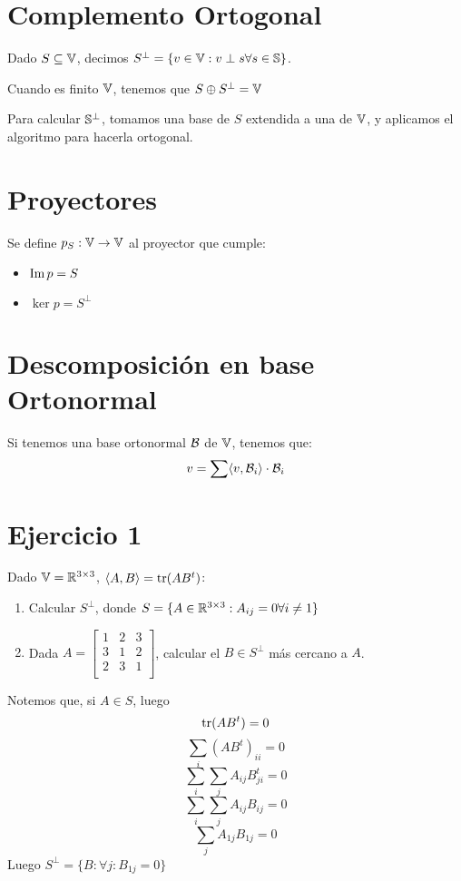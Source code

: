 \documentclass{article}
\begin{document}
\section*{Complemento Ortogonal}
Dado $S \inn \V$, decimos $S^\perp = \{ v \in \V : v \perp s \forall s \in \S \}$.

Cuando es finito $\V$, tenemos que $S \oplus S^\perp = \V$

Para calcular $\S^\perp$, tomamos una base de $S$ extendida a una de $\V$, y aplicamos el algoritmo para hacerla ortogonal.

\section*{Proyectores}
Se define $p_S : \V \to \V$ al proyector que cumple:
\begin{itemize}
    \item $\Ima p = S$
    \item $\ker p = S^\perp$
\end{itemize}

\section*{Descomposición en base Ortonormal}
Si tenemos una base ortonormal $\BB$ de $\V$, tenemos que:
\[
    v = \sum \langle v, \BB_i \rangle \cdot \BB_i
\]

\section*{Ejercicio 1}
Dado $\V = \R^{3 \times 3}$, $\langle A, B\rangle = \tr(AB^t)$:
\begin{enumerate}
    \item Calcular $S^\perp$, donde $S = \{A \in \R^{3 \times 3} : A_{ij} = 0 \forall i \neq 1\}$
    \item Dada $A = 
        \begin{bmatrix}
            1 & 2 & 3 \\
            3 & 1 & 2 \\
            2 & 3 & 1 \\
        \end{bmatrix}$, calcular el $B \in S^\perp$ más cercano a $A$.
\end{enumerate}

Notemos que, si $A \in S$, luego
\[\tr (AB^t) = 0\]
\[\sum_i (AB^t)_{ii} = 0\]
\[\sum_i \sum_j A_{ij} B^t_{ji} = 0\]
\[\sum_i \sum_j A_{ij} B_{ij} = 0\]
\[\sum_j A_{1j} B_{1j} = 0\]
Luego $S^\perp = \{B : \forall j : B_{1j} = 0\}$
\end{document}
